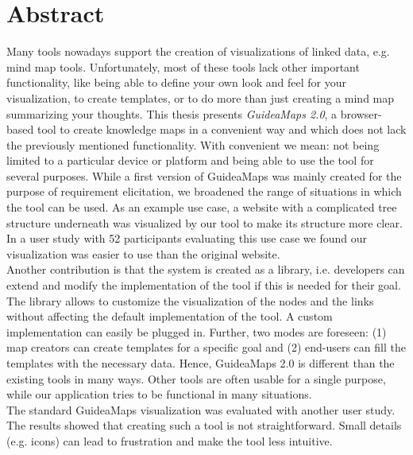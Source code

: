 \section*{Abstract}%

Many tools nowadays support the creation of visualizations of linked data, e.g. mind map tools. Unfortunately, most of these tools lack other important functionality, like being able to define your own look and feel for your visualization, to create templates, or to do more than just creating a mind map summarizing your thoughts. This thesis presents \textit{GuideaMaps 2.0}, a browser-based tool to create knowledge maps in a convenient way and which does not lack the previously mentioned functionality. With convenient we mean: not being limited to a particular device or platform and being able to use the tool for several purposes. While a first version of GuideaMaps was mainly created for the purpose of requirement elicitation, we broadened the range of situations in which the tool can be used. As an example use case, a website with a complicated tree structure underneath was visualized by our tool to make its structure more clear. In a user study with 52 participants evaluating this use case we found our visualization was easier to use than the original website.\\

Another contribution is that the system is created as a library, i.e. developers can extend and modify the implementation of the tool if this is needed for their goal. The library allows to customize the visualization of the nodes and the links without affecting the default implementation of the tool. A custom implementation can easily be plugged in. Further, two modes are foreseen: (1) map creators can create templates for a specific goal and (2) end-users can fill the templates with the necessary data. Hence, GuideaMaps 2.0 is different than the existing tools in many ways. Other tools are often usable for a single purpose, while our application tries to be functional in many situations.\\

The standard GuideaMaps visualization was evaluated with another user study. The results showed that creating such a tool is not straightforward. Small details (e.g. icons) can lead to frustration and make the tool less intuitive.